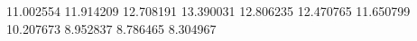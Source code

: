 11.002554
11.914209
12.708191
13.390031
12.806235
12.470765
11.650799
10.207673
8.952837
8.786465
8.304967
